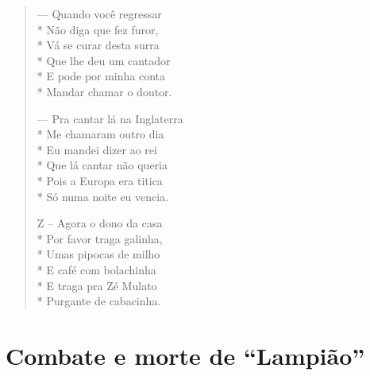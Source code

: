 \begin{verse}
— Quando você regressar\\*
Não diga que fez furor,\\*
Vá se curar desta surra\\*
Que lhe deu um cantador\\*
E pode por minha conta\\*
Mandar chamar o doutor.

— Pra cantar lá na Inglaterra\\*
Me chamaram outro dia\\*
Eu mandei dizer ao rei\\*
Que lá cantar não queria\\*
Pois a Europa era titica\\*
Só numa noite eu vencia.

Z – Agora o dono da casa\\*
Por favor traga galinha,\\*
Umas pipocas de milho\\*
E café com bolachinha\\*
E traga pra Zé Mulato\\*
Purgante de cabacinha.
\end{verse}

\chapter{Combate e morte de “Lampião”}

